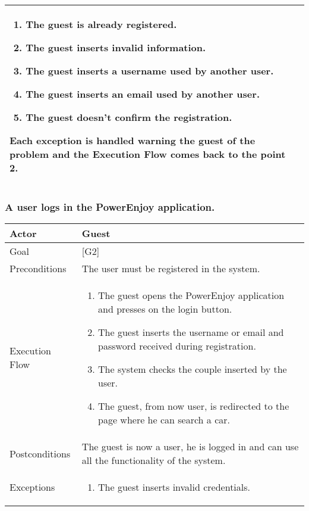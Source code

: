 \documentclass[english]{article}
\begin{document}
\begin{tabularx}{\textwidth}{  l  X  }
\begin{enumerate}
			\item{The guest is already registered.}
			\item{The guest inserts invalid information.}
			\item{The guest inserts a username used by another user.}
			\item{The guest inserts an email used by another user.}
			\item{The guest doesn't confirm the registration.}
		\end{enumerate}
		Each exception is handled warning the guest of the problem and the Execution Flow comes back to the point 2.\\
		\hline
	\end{tabularx}
	
	\subsubsection{A user logs in the PowerEnjoy application.}
	\begin{tabularx}{\textwidth}{  l  X  }
		\hline
		Actor & Guest\\
		\hline
		Goal & [G2]\\
		\hline
		Preconditions & The user must be registered in the system.\\
		\hline
		Execution Flow & \begin{enumerate}
			\item{The guest opens the PowerEnjoy application and presses on the login button.}
			\item{The guest inserts the username or email and password received during registration.}
			\item{The system checks the couple inserted by the user.}
			\item{The guest, from now user, is redirected to the page where he can search a car.}
		\end{enumerate}\\
		\hline
		Postconditions & The guest is now a user, he is logged in and can use all the functionality of the system.\\
		\hline
		Exceptions & \begin{enumerate}
			\item{The guest inserts invalid credentials.}
		\end{enumerate}\\
		\hline
	\end{tabularx}
	
\end{document}
